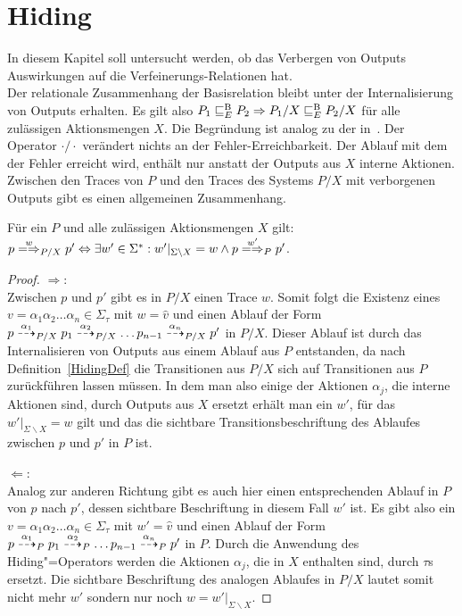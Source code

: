 \section{Hiding}

In diesem Kapitel soll untersucht werden, ob das Verbergen von Outputs
Auswirkungen auf die Verfeinerungs-Relationen \ERel{} hat.\\
Der relationale Zusammenhang der Basisrelation \EBRel{} bleibt unter der
Internalisierung von Outputs erhalten. Es gilt also $P_1 \sqsubseteq  _E^\mathrm{B} P_2 \Rightarrow
P_1/X \sqsubseteq  _E^\mathrm{B} P_2/X$ für alle zulässigen Aktionsmengen $X$. Die Begründung ist
analog zu der in~\cite{Schinko2016BA}. Der Operator $\cdot /\cdot$ verändert
nichts an der Fehler-Erreichbarkeit. Der Ablauf mit dem der Fehler erreicht
wird, enthält nur anstatt der Outputs aus $X$ interne Aktionen.\\
Zwischen den Traces von $P$ und den Traces des Systems $P/X$ mit verborgenen
Outputs gibt es einen allgemeinen Zusammenhang.

\begin{Lem}
  \label{TraceHidingLem}
  Für ein \MEIO{} $P$ und alle zulässigen Aktionsmengen $X$ gilt: $p
  \weakmay[w]_{P/X} p' \Leftrightarrow \exists w'\in \Sigma ^*:
  w'|_{\Sigma\backslash X} = w \land p \weakmay[w']_P p'$.
\end{Lem}
\begin{proof}
  \glqq $\Rightarrow$\grqq{}:\\
  Zwischen $p$ und $p'$ gibt es in $P/X$ einen Trace $w$. Somit folgt die
  Existenz eines $v=\alpha _1\alpha_2\dots\alpha _n\in\Sigma _{\tau}$ mit $w =
  \hat{v}$ und einen Ablauf der Form $p \may[\alpha _1]_{P/X} p_1 \may[\alpha
  _2]_{P/X} \dots p_{n-1} \may[\alpha _n]_{P/X} p'$ in $P/X$. Dieser Ablauf ist
  durch das Internalisieren von Outputs aus einem Ablauf aus $P$ entstanden, da
  nach Definition~\ref{HidingDef} die Transitionen aus $P/X$ sich auf
  Transitionen aus $P$ zurückführen lassen müssen. In dem man also einige der
  Aktionen $\alpha_j$, die interne Aktionen sind, durch Outputs aus $X$ ersetzt
  erhält man ein $w'$, für das $w'|_{\Sigma\backslash X}=w$ gilt und das die
  sichtbare Transitionsbeschriftung des Ablaufes zwischen $p$ und $p'$ in $P$
  ist.

  \glqq $\Leftarrow$\grqq{}:\\
  Analog zur anderen Richtung gibt es auch hier einen entsprechenden Ablauf in
  $P$ von $p$ nach $p'$, dessen sichtbare Beschriftung in diesem Fall $w'$ ist.
  Es gibt also ein $v=\alpha _1\alpha_2\dots\alpha _n\in\Sigma _{\tau}$ mit $w'
  = \hat{v}$ und einen Ablauf der Form $p \may[\alpha _1]_P p_1 \may[\alpha
  _2]_P \dots p_{n-1} \may[\alpha _n]_P p'$ in $P$. Durch die Anwendung des
  Hiding"=Operators werden die Aktionen $\alpha _j$, die in $X$ enthalten sind,
  durch $\tau$s ersetzt. Die sichtbare Beschriftung des analogen Ablaufes in
  $P/X$ lautet somit nicht mehr $w'$ sondern nur noch $w =
  w'|_{\Sigma\backslash X}$.
\end{proof}

